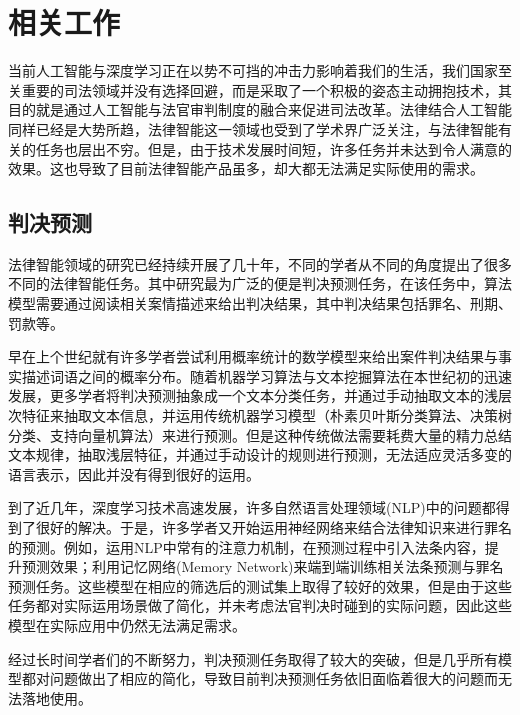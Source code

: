 \chapter{相关工作}
\label{cha:related}
当前人工智能与深度学习正在以势不可挡的冲击力影响着我们的生活，我们国家至关重要的司法领域并没有选择回避，而是采取了一个积极的姿态主动拥抱技术，其目的就是通过人工智能与法官审判制度的融合来促进司法改革。法律结合人工智能同样已经是大势所趋，法律智能这一领域也受到了学术界广泛关注，与法律智能有关的任务也层出不穷。但是，由于技术发展时间短，许多任务并未达到令人满意的效果。这也导致了目前法律智能产品虽多，却大都无法满足实际使用的需求。


\section{判决预测}

法律智能领域的研究已经持续开展了几十年，不同的学者从不同的角度提出了很多不同的法律智能任务。其中研究最为广泛的便是判决预测任务，在该任务中，算法模型需要通过阅读相关案情描述来给出判决结果，其中判决结果包括罪名、刑期、罚款等。

早在上个世纪就有许多学者尝试利用概率统计的数学模型来给出案件判决结果与事实描述词语之间的概率分布\cite{kort1957predicting,ulmer1963quantitative,segal1984predicting}。随着机器学习算法与文本挖掘算法在本世纪初的迅速发展，更多学者将判决预测抽象成一个文本分类任务，并通过手动抽取文本的浅层次特征来抽取文本信息\cite{liu2006exploring,lin2012exploiting,aletras2016predicting}，并运用传统机器学习模型（朴素贝叶斯分类算法、决策树分类、支持向量机算法）来进行预测。但是这种传统做法需要耗费大量的精力总结文本规律，抽取浅层特征，并通过手动设计的规则进行预测，无法适应灵活多变的语言表示，因此并没有得到很好的运用。

到了近几年，深度学习技术高速发展，许多自然语言处理领域(NLP)中的问题都得到了很好的解决\cite{kim2014convolutional,khan2010review,tang2015document}。于是，许多学者又开始运用神经网络来结合法律知识来进行罪名的预测。例如，\citet{luo2017learning}运用NLP中常有的注意力机制，在预测过程中引入法条内容，提升预测效果；\citet{shen2018legal}利用记忆网络(Memory Network)来端到端训练相关法条预测与罪名预测任务。这些模型在相应的筛选后的测试集上取得了较好的效果，但是由于这些任务都对实际运用场景做了简化，并未考虑法官判决时碰到的实际问题，因此这些模型在实际应用中仍然无法满足需求。

经过长时间学者们的不断努力，判决预测任务取得了较大的突破，但是几乎所有模型都对问题做出了相应的简化，导致目前判决预测任务依旧面临着很大的问题而无法落地使用。

